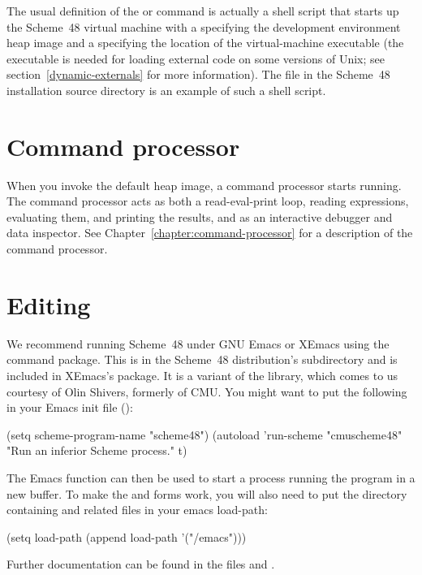 The usual definition of the  or  command is actually a
 shell script that starts up the Scheme~48 virtual machine with a
specifying the development environment heap image and a
  specifying the location of the virtual-machine
 executable (the executable is needed for loading external code on some
 versions of Unix; see section~\ref{dynamic-externals} for more information).
The file  in the Scheme~48 installation source directory is an example
 of such a shell script.

\section{Command processor}

When you invoke the default heap image, a command processor starts
 running.
The command processor acts as both a read-eval-print loop, reading
 expressions, evaluating them, and printing the results, and as
 an interactive debugger and data inspector.
See Chapter~\ref{chapter:command-processor} for
a description of the command processor.

\section{Editing}

We recommend running Scheme~48 under GNU Emacs or XEmacs using the
  command package.
This is in the Scheme~48 distribution's  subdirectory and
 is included in XEmacs's  package.
It is a variant of the  library, which
 comes to us courtesy of Olin Shivers, formerly of CMU.
You might want to put the following in your Emacs init file ():
\begin{example}
(setq scheme-program-name "scheme48")
(autoload 'run-scheme
          "cmuscheme48"
          "Run an inferior Scheme process."
          t)
\end{example}
The Emacs function  can then be used to start a process
 running the program  in a new buffer.
To make the  and  forms work, you will
also need
to put the directory containing  and related files in your
emacs load-path:
\begin{example}
(setq load-path
  (append load-path '("/emacs")))
\end{example}
Further documentation can be found in the files  and
.

